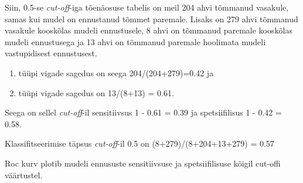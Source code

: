 \documentclass[]{book}
\newenvironment{Shaded}{\begin{snugshade}}{\end{snugshade}}
\newcommand{\KeywordTok}[1]{\textcolor[rgb]{0.13,0.29,0.53}{\textbf{#1}}}
\newcommand{\DataTypeTok}[1]{\textcolor[rgb]{0.13,0.29,0.53}{#1}}
\newcommand{\DecValTok}[1]{\textcolor[rgb]{0.00,0.00,0.81}{#1}}
\newcommand{\StringTok}[1]{\textcolor[rgb]{0.31,0.60,0.02}{#1}}
\newcommand{\CommentTok}[1]{\textcolor[rgb]{0.56,0.35,0.01}{\textit{#1}}}
\newcommand{\OtherTok}[1]{\textcolor[rgb]{0.56,0.35,0.01}{#1}}
\newcommand{\OperatorTok}[1]{\textcolor[rgb]{0.81,0.36,0.00}{\textbf{#1}}}
\newcommand{\NormalTok}[1]{#1}
\begin{document}
\begin{Shaded}
\end{Shaded}

Siin, 0.5-se \emph{cut-off}-iga tõenäosuse tabelis on meil 204 ahvi
tõmmanud vasakule, samas kui mudel on ennustanud tõmmet paremale. Lisaks
on 279 ahvi tõmmanud vasakule kooskõlas mudeli ennustusele, 8 ahvi on
tõmmanud paremale kooskõlas mudeli ennustusega ja 13 ahvi on tõmmanud
paremale hoolimata mudeli vastupidisest ennustusest.

\begin{enumerate}
\def\labelenumi{\arabic{enumi}.}
\item
  tüüpi vigade sagedus on seega 204/(204+279)=0.42 ja
\item
  tüüpi vigade sagedus on 13/(8+13) = 0.61.
\end{enumerate}

Seega on sellel \emph{cut-off}-il sensitiivsus 1 - 0.61 = 0.39 ja
spetsiifilisus 1 - 0.42 = 0.58.

Klassifitseerimise täpsus \emph{cut-off}-il 0.5 on
(8+279)/(8+204+13+279) = 0.57

Roc kurv plotib mudeli ennususte sensitiivsuse ja spetsiifilisuse kõigil
cut-offi väärtustel.
\end{document}
